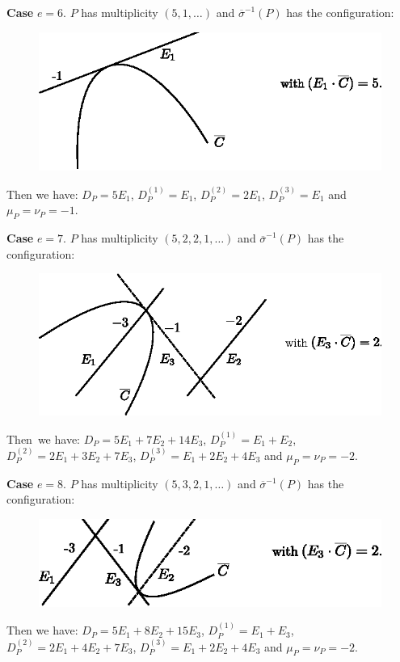 \medskip
\noindent
{\bf Case} $e=6$. $P$ has multiplicity $(5,1,\ldots)$ and
$\overline{\sigma}^{-1}(P)$ has the configuration:
\begin{figure}[H]
\centering
\includegraphics{figures/miyansi_fig32.eps}
\end{figure}
Then we have: $D_{P}=5E_{1}$, $D^{(1)}_{P}=E_{1}$,
$D^{(2)}_{P}=2E_{1}$, $D^{(3)}_{P}=E_{1}$ and $\mu_{P}=\nu_{P}=-1$.

\medskip
\noindent
{\bf Case} $e=7$. $P$ has multiplicity $(5,2,2,1,\ldots)$ and
$\overline{\sigma}^{-1}(P)$ has the configuration:
\begin{figure}[H]
\centering
\includegraphics{figures/miyansi_fig33.eps}
\end{figure}
Then\pageoriginale\ we have: $D_{P}=5E_{1}+7E_{2}+14E_{3}$,
$D^{(1)}_{P}=E_{1}+E_{2}$, $D^{(2)}_{P}=2E_{1}+3E_{2}+7E_{3}$,
$D^{(3)}_{P}=E_{1}+2E_{2}+4E_{3}$ and $\mu_{P}=\nu_{P}=-2$.

\medskip
\noindent
{\bf Case} $e=8$. $P$ has multiplicity $(5,3,2,1,\ldots)$ and
$\overline{\sigma}^{-1}(P)$ has the configuration:
\begin{figure}[H]
\centering
\includegraphics{figures/miyansi_fig34.eps}
\end{figure}
Then we have: $D_{P}=5E_{1}+8E_{2}+15E_{3}$,
$D^{(1)}_{P}=E_{1}+E_{3}$, $D^{(2)}_{P}=2E_{1}+4E_{2}+7E_{3}$,
$D^{(3)}_{P}=E_{1}+2E_{2}+4E_{3}$ and $\mu_{P}=\nu_{P}=-2$.

